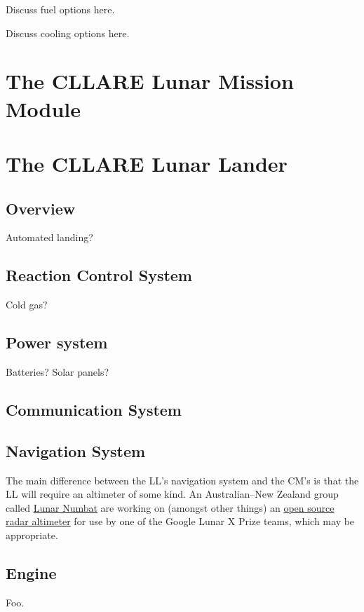 \documentclass{report}
\begin{document}
Discuss fuel options here.

Discuss cooling options here.


\section{The CLLARE Lunar Mission Module}


\section{The CLLARE Lunar Lander}

\subsection{Overview}

Automated landing?

\subsection{Reaction Control System}

Cold gas?

\subsection{Power system}

Batteries?  Solar panels?

\subsection{Communication System}

\subsection{Navigation System}

The main difference between the LL's navigation system and the CM's is that the LL will require an altimeter of some kind.  An Australian--New Zealand group called \href{http://www.lunarnumbat.org}{Lunar Numbat} are working on (amongst other things) an \href{http://www.lunarnumbat.org/cgi-bin/twiki/view/LunarNumbat/LNTaskRadarAltimeter}{open source radar altimeter} for use by one of the Google Lunar X Prize teams, which may be appropriate.

\subsection{Engine}

Foo.
\end{document}

